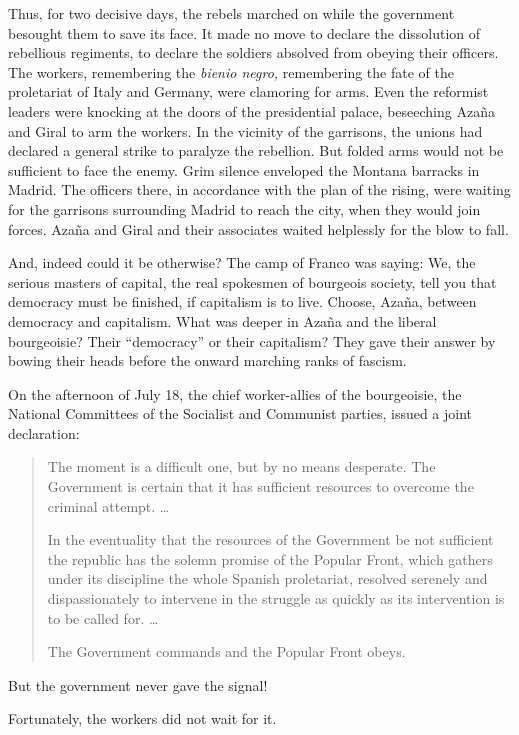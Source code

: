 \indexMAzana\indexJGiral
Thus, for two decisive days, the rebels marched on while the government besought them to save its face. It made no move to declare the dissolution of rebellious regiments, to declare the soldiers absolved from obeying their officers. The workers, remembering the \emph{bienio negro,} remembering the fate of the proletariat of Italy and Germany, were clamoring for arms. Even the reformist leaders were knocking at the doors of the presidential palace, beseeching Azaña and Giral to arm the workers. In the vicinity of the garrisons, the unions had declared a general strike to paralyze the rebellion. But folded arms would not be sufficient to face the enemy. Grim silence enveloped the Montana barracks in Madrid. The officers there, in accordance with the plan of the rising, were waiting for the garrisons surrounding Madrid to reach the city, when they would join forces. Azaña and Giral and their associates waited helplessly for the blow to fall.

And, indeed could it be otherwise? The camp of Franco was saying: We, the serious masters of capital, the real spokesmen of bourgeois society, tell you that democracy must be finished, if capitalism is to live. Choose, Azaña, between democracy and capitalism. What was deeper in Azaña and the liberal bourgeoisie? Their ``democracy'' or their capitalism? They gave their answer by bowing their heads before the onward marching ranks of fascism.

\indexPCE\indexPSOE
On the afternoon of July 18, the chief worker-allies of the bourgeoisie, the National Committees of the Socialist and Communist parties, issued a joint declaration:

\begin{quotation}
  The moment is a difficult one, but by no means desperate. The Government is certain that it has sufficient resources to overcome the criminal attempt. \dots
  
  In the eventuality that the resources of the Government be not sufficient the republic has the solemn promise of the Popular Front, which gathers under its discipline the whole Spanish proletariat, resolved serenely and dispassionately to intervene in the struggle as quickly as its intervention is to be called for. \dots
  
  The Government commands and the Popular Front obeys.
\end{quotation}

But the government never gave the signal!

\medskip

Fortunately, the workers did not wait for it.
